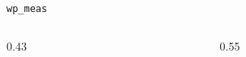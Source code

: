 \begin{frame}[fragile,t,shrink=5]{\texttt{wp\_meas}}
\begin{columns}[T, totalwidth=\linewidth]

  \begin{column}{0.43\textwidth}
    \informalProof
  \end{column}

  \begin{column}{0.55\textwidth}
    \vspace{-4pt}
    \begin{minipage}[t]{0.245\linewidth}
    \end{minipage}%
    \hspace{0.3pt}%
    \begin{minipage}[t]{0.245\linewidth}
    \end{minipage}%
    \hspace{0.3pt}%
    \begin{minipage}[t]{0.245\linewidth}
    \end{minipage}%
    \hspace{0.3pt}%
    \begin{minipage}[t]{0.245\linewidth}
    \end{minipage}
  \end{column}

\end{columns}
\end{frame}
